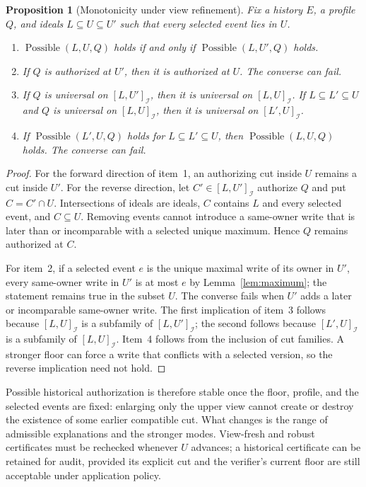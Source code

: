\documentclass[11pt]{article}
\newtheorem{proposition}[theorem]{Proposition}
\theoremstyle{definition}
\newcommand{\Id}{\mathcal I}
\begin{document}
\begin{proposition}[Monotonicity under view refinement]\label{prop:viewlaws}
Fix a history $E$, a profile $Q$, and ideals $L\subseteq U\subseteq U'$ such that every selected event lies in $U$.
\begin{enumerate}
  \item $\operatorname{Possible}(L,U,Q)$ holds if and only if $\operatorname{Possible}(L,U',Q)$ holds.
  \item If $Q$ is authorized at $U'$, then it is authorized at $U$.  The converse can fail.
  \item If $Q$ is universal on $[L,U']_{\Id}$, then it is universal on $[L,U]_{\Id}$.  If $L\subseteq L'\subseteq U$ and $Q$ is universal on $[L,U]_{\Id}$, then it is universal on $[L',U]_{\Id}$.
  \item If $\operatorname{Possible}(L',U,Q)$ holds for $L\subseteq L'\subseteq U$, then $\operatorname{Possible}(L,U,Q)$ holds.  The converse can fail.
\end{enumerate}
\end{proposition}
\begin{proof}
For the forward direction of item~1, an authorizing cut inside $U$ remains a cut inside $U'$.  For the reverse direction, let $C'\in[L,U']_{\Id}$ authorize $Q$ and put $C=C'\cap U$.  Intersections of ideals are ideals, $C$ contains $L$ and every selected event, and $C\subseteq U$.  Removing events cannot introduce a same-owner write that is later than or incomparable with a selected unique maximum.  Hence $Q$ remains authorized at $C$.

For item~2, if a selected event $e$ is the unique maximal write of its owner in $U'$, every same-owner write in $U'$ is at most $e$ by Lemma~\ref{lem:maximum}; the statement remains true in the subset $U$.  The converse fails when $U'$ adds a later or incomparable same-owner write.  The first implication of item~3 follows because $[L,U]_{\Id}$ is a subfamily of $[L,U']_{\Id}$; the second follows because $[L',U]_{\Id}$ is a subfamily of $[L,U]_{\Id}$.  Item~4 follows from the inclusion of cut families.  A stronger floor can force a write that conflicts with a selected version, so the reverse implication need not hold.
\end{proof}

Possible historical authorization is therefore stable once the floor, profile, and the selected events are fixed: enlarging only the upper view cannot create or destroy the existence of some earlier compatible cut.  What changes is the range of admissible explanations and the stronger modes.  View-fresh and robust certificates must be rechecked whenever $U$ advances; a historical certificate can be retained for audit, provided its explicit cut and the verifier's current floor are still acceptable under application policy.
\end{document}
